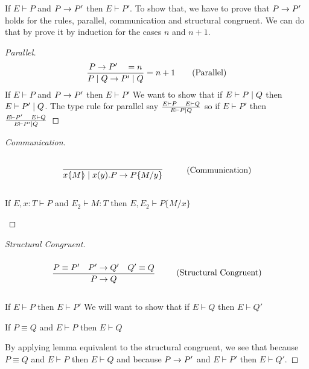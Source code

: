 \begin{theorem}
If \ensuremath{E \vdash P} and \ensuremath{P\ra P'} then \ensuremath{E \vdash P'}.
To show that, we have to prove that \ensuremath{P \ra P'} holds for the rules, parallel, communication and structural congruent. We can do that by prove it by induction for the cases \ensuremath{n} and \ensuremath{n+1}.

\begin{proof}[Parallel]
\begin{align*}
    \frac{P \rightarrow P' \quad =n}{P \mid Q \rightarrow P' \mid Q} =n+1 \tag{Parallel}
\end{align*}
If \ensuremath{E \vdash P} and \ensuremath{P \ra P'} then \ensuremath{E \vdash P'} We want to show that if \ensuremath{E \vdash P \para Q} then \ensuremath{E \vdash P' \para Q}. The type rule for parallel say \ensuremath{\frac{E \vdash P\quad E \vdash Q}{E \vdash P \para Q}} so if \ensuremath{E \vdash P'} then \ensuremath{\frac{E \vdash P' \quad E \vdash Q}{E \vdash P' \para Q}}
\end{proof}

\begin{proof}[Communication]
\begin{align*}
    \infrule{}{\lift{x}{M}\para\inp{x}{y}P\ra P\{M/y\}} \tag{Communication}
\end{align*}

\begin{lemma}[Substitution]
If \ensuremath{E,x:T \vdash P} and \ensuremath{E_2 \vdash M:T} then \ensuremath{E, E_2 \vdash P\{M/x \}}
\end{lemma}

\end{proof}

\begin{proof}[Structural Congruent]
\begin{align*}
    \infrule{P \equiv P' \quad P' \ra Q' \quad Q' \equiv Q}{P \ra Q} \tag{Structural Congruent}
\end{align*}

If \ensuremath{E \vdash P} then \ensuremath{E \vdash P'} We will want to show that if \ensuremath{E \vdash Q} then \ensuremath{E \vdash Q'}

\begin{lemma}[Equivalent]
If \ensuremath{P \equiv Q} and \ensuremath{E \vdash P} then \ensuremath{E \vdash Q}
\end{lemma}

By applying lemma equivalent to the structural congruent, we see that because \ensuremath{P \equiv Q} and \ensuremath{E \vdash P} then \ensuremath{E \vdash Q} and because \ensuremath{P \ra P'} and \ensuremath{E \vdash P'} then \ensuremath{E \vdash Q'}.
\end{proof}

\end{theorem}





